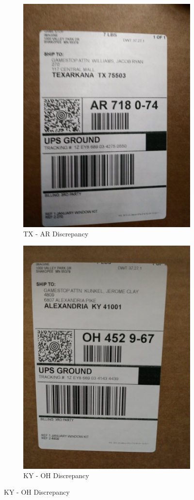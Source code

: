\documentclass[12pt]{article}
\begin{document}
\begin{figure}[H]
\begin{subfigure}{0.5\textwidth}
\end{subfigure}
\begin{subfigure}{0.5\textwidth}
\centering
\includegraphics[width=0.7\linewidth]{20171221_173426} 
\caption{TX - AR Discrepancy}
\end{subfigure}
\begin{subfigure}{0.5\textwidth}
\centering
\includegraphics[width=0.7\linewidth]{20171221_171849} 
\caption{KY - OH Discrepancy}
\end{subfigure}

\end{figure}
\end{document}
